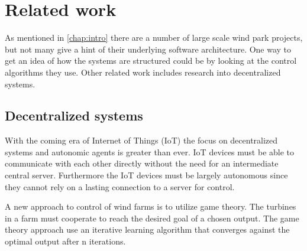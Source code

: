\chapter{Related work}
As mentioned in \cref{chap:intro} there are a number of large scale wind park projects, but not many give a hint of their underlying software architecture.
One way to get an idea of how the systems are structured could be by looking at the control algorithms they use.
Other related work includes research into decentralized systems.


\section{Decentralized systems}
With the coming era of Internet of Things (IoT) the focus on decentralized systems and autonomic agents is greater than ever.
IoT devices must be able to communicate with each other directly without the need for an intermediate central server.
Furthermore the IoT devices must be largely autonomous since they cannot rely on a lasting connection to a server for control.

A new approach to control of wind farms is to utilize game theory\cite{AModelFreeApproachToWindFarmControl}.
The turbines in a farm must cooperate to reach the desired goal of a chosen output.
The game theory approach use an iterative learning algorithm that converges against the optimal output after n iterations.


